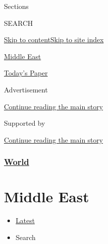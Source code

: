 Sections

SEARCH

\protect\hyperlink{site-content}{Skip to
content}\protect\hyperlink{site-index}{Skip to site index}

\href{https://www.nytimes3xbfgragh.onion/section/world/middleeast}{Middle
East}

\href{https://myaccount.nytimes3xbfgragh.onion/auth/login?response_type=cookie\&client_id=vi}{}

\href{https://www.nytimes3xbfgragh.onion/section/todayspaper}{Today's
Paper}

Advertisement

\protect\hyperlink{after-top}{Continue reading the main story}

Supported by

\protect\hyperlink{after-sponsor}{Continue reading the main story}

\hypertarget{world}{%
\subsubsection{\texorpdfstring{\href{/section/world}{World}}{World}}\label{world}}

\hypertarget{middle-east}{%
\section{Middle East}\label{middle-east}}

\begin{itemize}
\tightlist
\item
  \protect\hyperlink{stream-panel}{Latest}
\item
  Search
\end{itemize}

